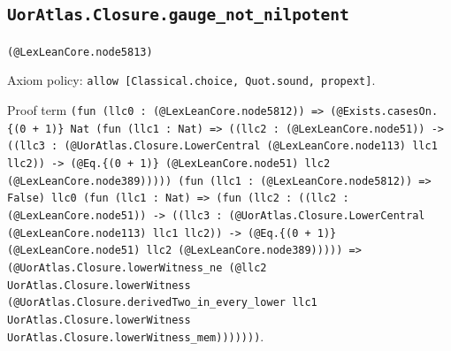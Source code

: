 \documentclass[11pt]{article}
\begin{document}
\subsection*{\texttt{UorAtlas.Closure.gauge\_not\_nilpotent}}
\noindent\texttt{(@LexLeanCore.node5813)}\par
\noindent Axiom policy: \texttt{allow [Classical.choice, Quot.sound, propext]}.\par
\noindent Proof term \texttt{(fun (llc0 : (@LexLeanCore.node5812)) => (@Exists.casesOn.\{(0 + 1)\} Nat (fun (llc1 : Nat) => ((llc2 : (@LexLeanCore.node51)) -> ((llc3 : (@UorAtlas.Closure.LowerCentral (@LexLeanCore.node113) llc1 llc2)) -> (@Eq.\{(0 + 1)\} (@LexLeanCore.node51) llc2 (@LexLeanCore.node389))))) (fun (llc1 : (@LexLeanCore.node5812)) => False) llc0 (fun (llc1 : Nat) => (fun (llc2 : ((llc2 : (@LexLeanCore.node51)) -> ((llc3 : (@UorAtlas.Closure.LowerCentral (@LexLeanCore.node113) llc1 llc2)) -> (@Eq.\{(0 + 1)\} (@LexLeanCore.node51) llc2 (@LexLeanCore.node389))))) => (@UorAtlas.Closure.lowerWitness\_ne (@llc2 UorAtlas.Closure.lowerWitness (@UorAtlas.Closure.derivedTwo\_in\_every\_lower llc1 UorAtlas.Closure.lowerWitness UorAtlas.Closure.lowerWitness\_mem)))))))}.\par
\end{document}
